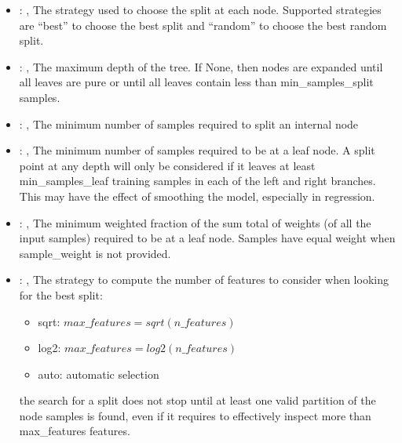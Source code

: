 \begin{itemize}
    \item {}: , 
      The strategy used to choose the split at each node. Supported strategies are ``best''
      to choose the best split and ``random'' to choose the best random split.

    \item {}: , 
      The maximum depth of the tree. If None, then nodes are expanded until all leaves are pure
      or until all leaves contain less than min\_samples\_split samples.

    \item {}: , 
      The minimum number of samples required to split an internal node

    \item {}: , 
      The minimum number of samples required to be at a leaf node. A split point at any
      depth will only be considered if it leaves at least min\_samples\_leaf training samples in
      each                                                  of the left and right branches. This may
      have the effect of smoothing the model, especially
      in regression.

    \item {}: , 
      The minimum weighted fraction of the sum total of weights (of all the input samples)
      required to be at a leaf node. Samples have equal weight when sample\_weight is not provided.

    \item {}: , 
      The strategy to compute the number of features to consider when looking for the best split:
      \begin{itemize}                                                     \item sqrt:
      $max\_features=sqrt(n\_features)$                                                     \item
      log2: $max\_features=log2(n\_features)$
      \item auto: automatic selection
      \end{itemize}                                                   \nb the search for a split
      does not stop until at least one valid partition of the node
      samples is found, even if it requires to effectively inspect more than max\_features features.


\end{itemize}
